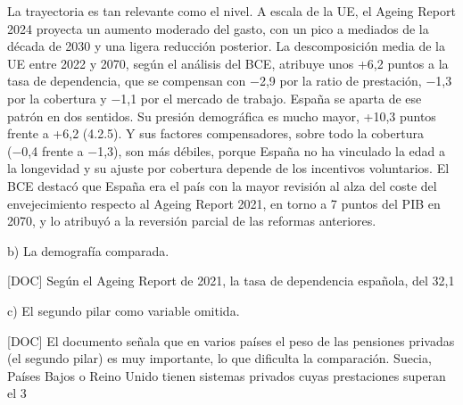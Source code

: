 \documentclass[10pt,a4paper]{article}
\begin{document}
La trayectoria es tan relevante como el nivel. A escala de la UE, el Ageing Report 2024 proyecta un aumento moderado del gasto, con un pico a mediados de la década de 2030 y una ligera reducción posterior. La descomposición media de la UE entre 2022 y 2070, según el análisis del BCE, atribuye unos +6,2 puntos a la tasa de dependencia, que se compensan con −2,9 por la ratio de prestación, −1,3 por la cobertura y −1,1 por el mercado de trabajo. España se aparta de ese patrón en dos sentidos. Su presión demográfica es mucho mayor, +10,3 puntos frente a +6,2 (4.2.5). Y sus factores compensadores, sobre todo la cobertura (−0,4 frente a −1,3), son más débiles, porque España no ha vinculado la edad a la longevidad y su ajuste por cobertura depende de los incentivos voluntarios. El BCE destacó que España era el país con la mayor revisión al alza del coste del envejecimiento respecto al Ageing Report 2021, en torno a 7 puntos del PIB en 2070, y lo atribuyó a la reversión parcial de las reformas anteriores.

b) La demografía comparada.

[DOC] Según el Ageing Report de 2021, la tasa de dependencia española, del 32,1%

c) El segundo pilar como variable omitida.

[DOC] El documento señala que en varios países el peso de las pensiones privadas (el segundo pilar) es muy importante, lo que dificulta la comparación. Suecia, Países Bajos o Reino Unido tienen sistemas privados cuyas prestaciones superan el 3%
\end{document}
